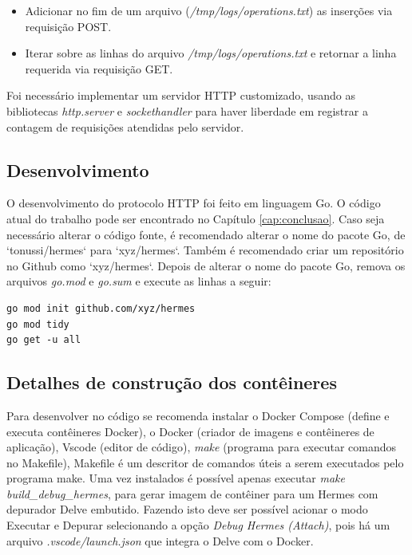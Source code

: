 \begin{itemize}
\item Adicionar no fim de um arquivo (\textit{/tmp/logs/operations.txt}) as inserções via requisição POST.
\item Iterar sobre as linhas do arquivo \textit{/tmp/logs/operations.txt} e retornar a linha requerida via requisição GET.
\end{itemize}

Foi necessário implementar um servidor \gls{HTTP} customizado, usando as bibliotecas \textit{http.server} e \textit{sockethandler} para haver liberdade em registrar a contagem de requisições atendidas pelo servidor.

\subsection{Desenvolvimento}

O desenvolvimento do protocolo \gls{HTTP} foi feito em linguagem Go. O código atual do trabalho pode ser encontrado no Capítulo \ref{cap:conclusao}. Caso seja necessário alterar o código fonte, é recomendado alterar o nome do pacote Go, de `tonussi/hermes` para `xyz/hermes`. Também é recomendado criar um repositório no Github como `xyz/hermes`. Depois de alterar o nome do pacote Go, remova os arquivos \textit{go.mod} e \textit{go.sum} e execute as linhas a seguir:

\begin{verbatim}
go mod init github.com/xyz/hermes
go mod tidy
go get -u all
\end{verbatim}

\subsection{Detalhes de construção dos contêineres}

Para desenvolver no código se recomenda instalar o Docker Compose (define e executa contêineres Docker), o Docker (criador de imagens e contêineres de aplicação), Vscode (editor de código), \textit{make} (programa para executar comandos no Makefile), Makefile é um descritor de comandos úteis a serem executados pelo programa make. Uma vez instalados é possível apenas executar \textit{make build\_debug\_hermes}, para gerar imagem de contêiner para um Hermes com depurador Delve embutido. Fazendo isto deve ser possível acionar o modo Executar e Depurar selecionando a opção \textit{Debug Hermes (Attach)}, pois há um arquivo \textit{.vscode/launch.json} que integra o Delve com o Docker.

